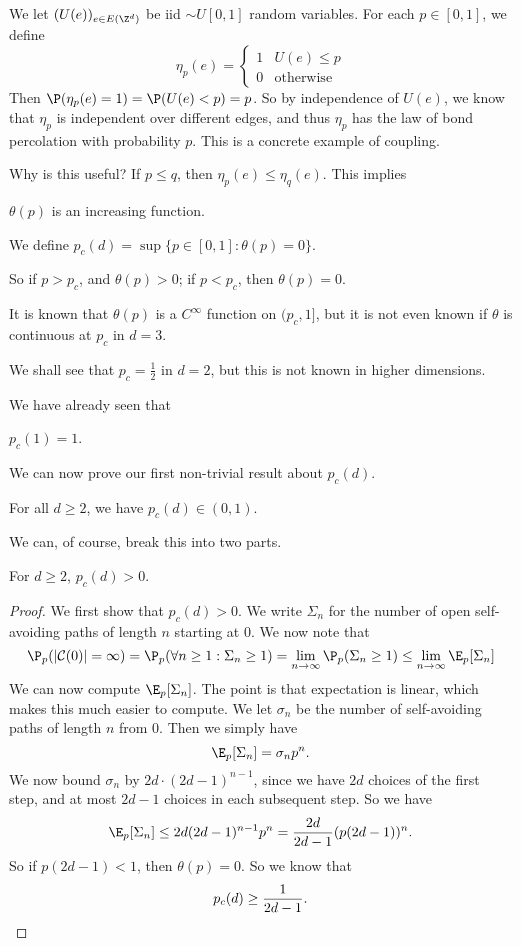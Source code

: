 \documentclass[a4paper]{article}
\begin{document}
We let $(U(e))_{e \in E(\Z^d)}$ be iid $\sim U[0, 1]$ random variables. For each $p \in [0, 1]$, we define
\[
  \eta_p(e) =
  \begin{cases}
    1 & U(e) \leq p\\
    0 & \text{otherwise}
  \end{cases}
\]
Then $\P(\eta_p(e) = 1) = \P(U(e) < p) = p$. So by independence of $U(e)$, we know that $\eta_p$ is independent over different edges, and thus $\eta_p$ has the law of bond percolation with probability $p$. This is a concrete example of coupling.

Why is this useful? If $p \leq q$, then $\eta_p(e) \leq \eta_q(e)$. This implies
\begin{lemma}
  $\theta(p)$ is an increasing function.
\end{lemma}

\begin{defi}
  We define $p_c(d) = \sup \{p \in [0, 1]: \theta(p) = 0\}$.
\end{defi}

So if $p > p_c$, and $\theta(p) > 0$; if $p < p_c$, then $\theta(p) = 0$.

It is known that $\theta(p)$ is a $C^\infty$ function on $(p_c, 1]$, but it is not even known if $\theta$ is continuous at $p_c$ in $d = 3$.

We shall see that $p_c = \frac{1}{2}$ in $d = 2$, but this is not known in higher dimensions.

We have already seen that
\begin{thm}
  $p_c(1) = 1$.
\end{thm}

We can now prove our first non-trivial result about $p_c(d)$.
\begin{thm}
  For all $d \geq 2$, we have $p_c(d) \in (0, 1)$.
\end{thm}

We can, of course, break this into two parts.
\begin{lemma}
  For $d \geq 2$, $p_c(d) > 0$.
\end{lemma}

\begin{proof}
  We first show that $p_c(d) > 0$. We write $\Sigma_n$ for the number of open self-avoiding paths of length $n$ starting at $0$. We now note that
  \[
    \P_p(|\mathcal{C}(0)| = \infty) = \P_p(\forall n \geq 1: \Sigma_n \geq 1) = \lim_{n \to \infty} \P_p(\Sigma_n \geq 1) \leq \lim_{n \to \infty} \E_p[\Sigma_n] %
  \]
  We can now compute $\E_p[\Sigma_n]$. The point is that expectation is linear, which makes this much easier to compute. We let $\sigma_n$ be the number of self-avoiding paths of length $n$ from $0$. Then we simply have
  \[
    \E_p[\Sigma_n] = \sigma_n p^n.
  \]
  We now bound $\sigma_n$ by $2d \cdot (2d - 1)^{n - 1}$, since we have $2d$ choices of the first step, and at most $2d - 1$ choices in each subsequent step. So we have
  \[
    \E_p[\Sigma_n] \leq 2d (2d - 1)^{n - 1} p^n = \frac{2d}{2d - 1} (p(2d - 1))^n.
  \]
  So if $p (2d - 1) < 1$, then $\theta(p) = 0$. So we know that
  \[
    p_c(d) \geq \frac{1}{2d - 1}.\qedhere
  \]
\end{proof}
\end{document}
